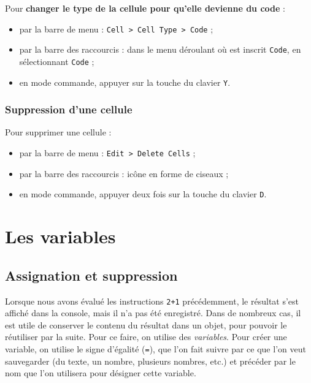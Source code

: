 \documentclass[12pt,]{book}
\providecommand{\tightlist}{%
  \setlength{\itemsep}{0pt}\setlength{\parskip}{0pt}}
\numberwithin{equation}{section}
\numberwithin{countremarque}{section}
\begin{document}
Pour \textbf{changer le type de la cellule pour qu'elle devienne du
code} :

\begin{itemize}
\tightlist
\item
  par la barre de menu :
  \texttt{Cell\ \textgreater{}\ Cell\ Type\ \textgreater{}\ Code} ;
\item
  par la barre des raccourcis : dans le menu déroulant où est inscrit
  \texttt{Code}, en sélectionnant \texttt{Code} ;
\item
  en mode commande, appuyer sur la touche du clavier \texttt{Y}.
\end{itemize}

\subsubsection{Suppression d'une
cellule}\label{suppression-dune-cellule}

Pour supprimer une cellule :

\begin{itemize}
\tightlist
\item
  par la barre de menu : \texttt{Edit\ \textgreater{}\ Delete\ Cells} ;
\item
  par la barre des raccourcis : icône en forme de ciseaux ;
\item
  en mode commande, appuyer deux fois sur la touche du clavier
  \texttt{D}.
\end{itemize}

\section{Les variables}\label{les-variables}

\subsection{Assignation et
suppression}\label{assignation-et-suppression}

Lorsque nous avons évalué les instructions \texttt{2+1} précédemment, le
résultat s'est affiché dans la console, mais il n'a pas été enregistré.
Dans de nombreux cas, il est utile de conserver le contenu du résultat
dans un objet, pour pouvoir le réutiliser par la suite. Pour ce faire,
on utilise des \emph{variables}. Pour créer une variable, on utilise le
signe d'égalité (\texttt{=}), que l'on fait suivre par ce que l'on veut
sauvegarder (du texte, un nombre, plusieurs nombres, etc.) et précéder
par le nom que l'on utilisera pour désigner cette variable.
\end{document}
